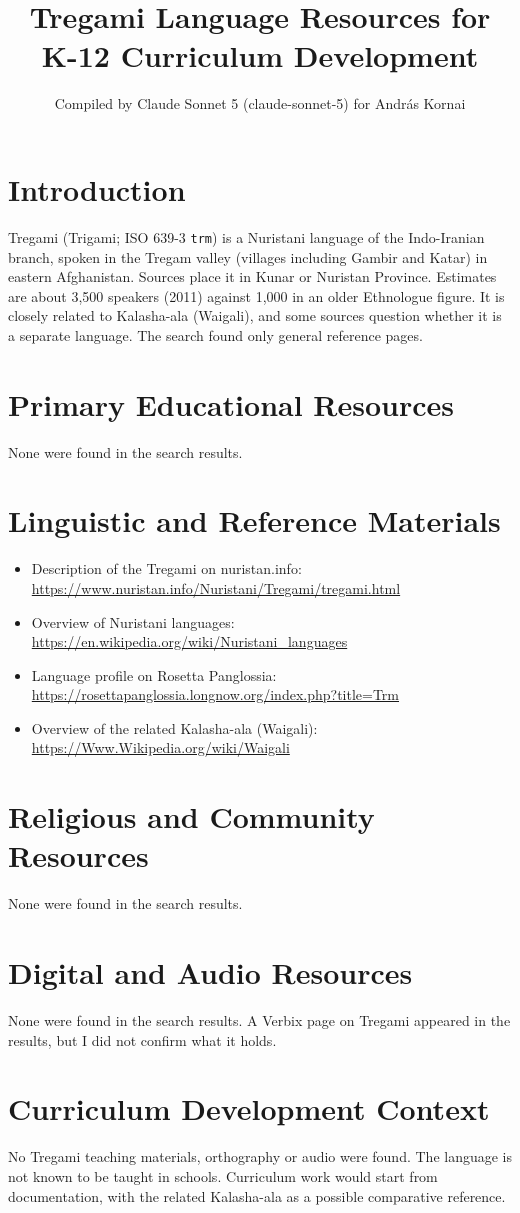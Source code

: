 \documentclass[12pt]{article}
\title{Tregami Language Resources for K-12 Curriculum Development}
\author{Compiled by Claude Sonnet 5 (claude-sonnet-5) for Andr\'as Kornai}
\date{}
\begin{document}
\maketitle

\section{Introduction}
Tregami (Trigami; ISO 639-3 \texttt{trm}) is a Nuristani language of the Indo-Iranian branch, spoken in the Tregam valley (villages including Gambir and Katar) in eastern Afghanistan. Sources place it in Kunar or Nuristan Province. Estimates are about 3,500 speakers (2011) against 1,000 in an older Ethnologue figure. It is closely related to Kalasha-ala (Waigali), and some sources question whether it is a separate language. The search found only general reference pages.

\section{Primary Educational Resources}
None were found in the search results.

\section{Linguistic and Reference Materials}
\begin{itemize}
\item Description of the Tregami on nuristan.info: \url{https://www.nuristan.info/Nuristani/Tregami/tregami.html}
\item Overview of Nuristani languages: \url{https://en.wikipedia.org/wiki/Nuristani_languages}
\item Language profile on Rosetta Panglossia: \url{https://rosettapanglossia.longnow.org/index.php?title=Trm}
\item Overview of the related Kalasha-ala (Waigali): \url{https://Www.Wikipedia.org/wiki/Waigali}
\end{itemize}

\section{Religious and Community Resources}
None were found in the search results.

\section{Digital and Audio Resources}
None were found in the search results. A Verbix page on Tregami appeared in the results, but I did not confirm what it holds.

\section{Curriculum Development Context}
No Tregami teaching materials, orthography or audio were found. The language is not known to be taught in schools. Curriculum work would start from documentation, with the related Kalasha-ala as a possible comparative reference.
\end{document}

